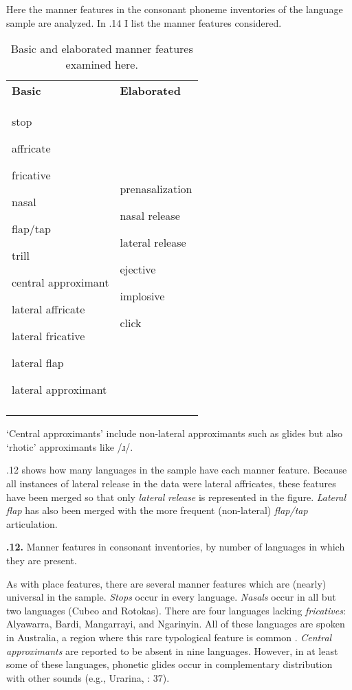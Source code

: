   Here the manner features in the consonant phoneme inventories of the language sample are analyzed. In .14 I list the manner features considered.






\begin{table}
\begin{tabularx}{\textwidth}{XX}
\lsptoprule

\textbf{Basic} & \textbf{Elaborated}\\
stop

affricate

fricative

nasal

flap/tap

trill

central approximant

lateral affricate

lateral fricative

lateral flap

lateral approximant & prenasalization

nasal release

lateral release

ejective

implosive

click\\
\lspbottomrule
\end{tabularx}
\caption{\label{4.14}Basic and elaborated manner features examined here.}‘Central approximants’ include non-lateral approximants such as glides but also ‘rhotic’ approximants like /ɹ/.
\end{table}




  .12 shows how many languages in the sample have each manner feature. Because all instances of lateral release in the data were lateral affricates, these features have been merged so that only \textit{lateral} \textit{release} is represented in the figure. \textit{Lateral} \textit{flap} has also been merged with the more frequent (non-lateral) \textit{flap/tap} articulation.



\textbf{.12.} Manner features in consonant inventories, by number of languages in which they are present.



  As with place features, there are several manner features which are (nearly) universal in the sample. \textit{Stops} occur in every language. \textit{Nasals} occur in all but two languages (Cubeo and Rotokas). There are four languages lacking \textit{fricatives}: Alyawarra, Bardi, Mangarrayi, and Ngarinyin. All of these languages are spoken in Australia, a region where this rare typological feature is common \citep[42]{Maddieson1984}. \textit{Central} \textit{approximants} are reported to be absent in nine languages. However, in at least some of these languages, phonetic glides occur in complementary distribution with other sounds (e.g., Urarina, \citealt{Olawsky2006}: 37).



